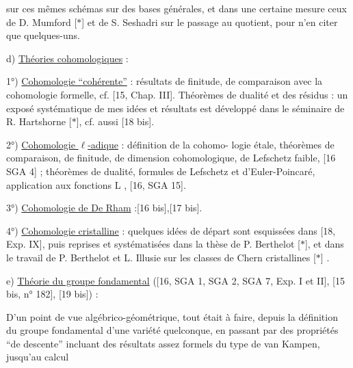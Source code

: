 
sur ces mêmes schémas sur des bases générales, et dans
une certaine mesure ceux de D. Mumford [$*$] et de
S. Seshadri sur le passage au quotient, pour n'en
citer que quelques-uns.

d) \uline{Théories cohomologiques} :

1°) \uline{Cohomologie ``cohérente''} : résultats de finitude,
de comparaison avec la cohomologie formelle, cf.
[15, Chap. III]. Théorèmes de dualité et des résidus :
un exposé systématique de mes idées et résultats est
développé dans le séminaire de R. Hartshorne [$*$],
cf. aussi [18 bis].

2°) \uline{Cohomologie $\ell$-adique} : définition de la cohomo-%
logie étale, théorèmes de comparaison, de finitude,
de dimension cohomologique, de Lefschetz faible,
[16 SGA 4] ; théorèmes de dualité, formules de Lefschetz
et d'Euler-Poincaré, application aux fonctions L ,
[16, SGA 15].

3°) \uline{Cohomologie de De Rham} :[16 bis],[17 bis].

4°) \uline{Cohomologie cristalline} : quelques idées de
départ sont esquissées dans [18, Exp. IX], puis reprises
et systématisées dans la thèse de P. Berthelot [$*$],
et dans le travail de P. Berthelot et L. Illusie sur
les classes de Chern cristallines [$*$] .

e) \uline{Théorie du groupe fondamental} ([16, SGA 1, SGA 2,
SGA 7, Exp. I et II], [15 bis, n° 182], [19 bis]) :

D'un point de vue algébrico-géométrique,
tout était à faire, depuis la définition du groupe
fondamental d'une variété quelconque, en passant par
des propriétés ``de descente'' incluant des résultats
assez formels du type de van Kampen, jusqu'au calcul

